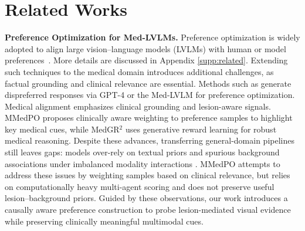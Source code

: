 \section{Related Works}
\label{sec:related}


\noindent\textbf{Preference Optimization for Med-LVLMs.} 
Preference optimization is widely adopted to align large vision–language models (LVLMs) with human or model preferences~\cite{Christiano2017RLHF,Schulman2017PPO,ouyang2022training,Ethayarajh2024KTO,liustatistical,hong2024reference,meng2024simpo,wu2025selfplay,liu2025survey}. More details are discussed in Appendix \ref{supp:related}. Extending such techniques to the medical domain introduces additional challenges, as factual grounding and clinical relevance are essential. Methods such as \cite{banerjee2024direct, sun2024stllava,hein2024preference} generate dispreferred responses via GPT-4 or the Med-LVLM for preference optimization.
Medical alignment emphasizes clinical grounding and lesion-aware signals.
MMedPO \cite{Zhu2025MMedPO} proposes clinically aware weighting to preference samples to highlight key medical cues, while MedGR$^{2}$ \cite{Zhi2025MedGR2} uses generative reward learning for robust medical reasoning.
Despite these advances, transferring general-domain pipelines still leaves gaps: models over-rely on textual priors and spurious background associations under imbalanced modality interactions \cite{Royer2024MultiMedEval,Cui2023GPT4VHallucination}.
MMedPO attempts to address these issues by weighting samples based on clinical relevance, but relies on computationally heavy multi-agent scoring and does not preserve useful lesion–background priors.
Guided by these observations, our work introduces a causally aware preference construction to probe lesion-mediated visual evidence while preserving clinically meaningful multimodal cues.

